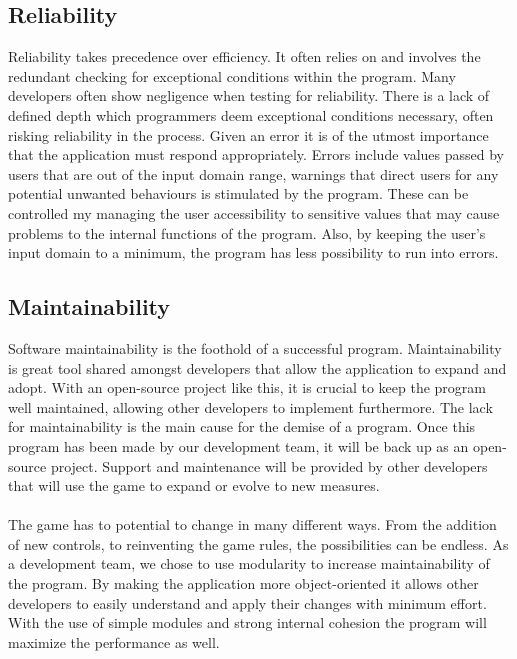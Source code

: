 \documentclass[12pt]{article}
\begin{document}
\subsection{Reliability}
Reliability takes precedence over efficiency. It often relies on and involves the redundant checking for exceptional conditions within the program. Many developers often show negligence when testing for reliability. There is a lack of defined depth which programmers deem exceptional conditions necessary, often risking reliability in the process. Given an error it is of the utmost importance that the application must respond appropriately. Errors include values passed by users that are out of the input domain range, warnings that direct users for any potential unwanted behaviours is stimulated by the program. These can be controlled my managing the user accessibility to sensitive values that may cause problems to the internal functions of the program.  Also, by keeping the user’s input domain to a minimum, the program has less possibility to run into errors. 

\subsection{Maintainability}
Software maintainability is the foothold of a successful program. Maintainability is great tool shared amongst developers that allow the application to expand and adopt. With an open-source project like this, it is crucial to keep the program well maintained, allowing other developers to implement furthermore. The lack for maintainability is the main cause for the demise of a program. Once this program has been made by our development team, it will be back up as an open-source project. Support and maintenance will be provided by other developers that will use the game to expand or evolve to new measures.\\\\
The game has to potential to change in many different ways. From the addition of new controls, to reinventing the game rules, the possibilities can be endless. As a development team, we chose to use modularity to increase maintainability of the program. By making the application more object-oriented it allows other developers to easily understand and apply their changes with minimum effort. With the use of simple modules and strong internal cohesion the program will maximize the performance as well.
\end{document}
